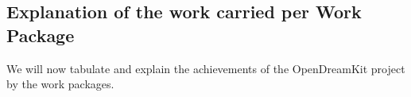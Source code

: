 \subsection{Explanation of the work carried per Work Package}\label{sec:achievements}
We will now tabulate and explain the achievements of the OpenDreamKit project by the work packages.

\newpage
\newpage
\newpage
\newpage
\newpage



